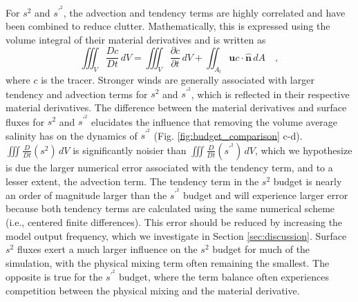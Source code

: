 For $s^2$ and $s^{\prime^2}$, the advection and tendency terms are highly correlated and have been combined to reduce clutter. Mathematically, this is expressed using the volume integral of their material derivatives and is written as 
\begin{equation}
    \iiint_V \frac{Dc}{Dt} \, dV = \iiint_V \frac{\partial c}{\partial t} \, dV + \iint_{A_l} \mathbf{u}c \cdot \hat{\mathbf{n}} \, dA \quad ,
\end{equation}
 where $c$ is the tracer. Stronger winds are generally associated with larger tendency and advection terms for $s^2$ and $s^{\prime^2}$, which is reflected in their respective material derivatives. The difference between the material derivatives and surface fluxes for $s^2$ and $s^{\prime^2}$ elucidates the influence that removing the volume average salinity has on the dynamics of $s^{\prime^2}$ (Fig. \ref{fig:budget_comparison} c-d). $\iiint \frac{D}{Dt}(s^2) \, dV$ is significantly noisier than $\iiint \frac{D}{Dt}(s^{\prime^2}) \, dV$, which we hypothesize is due the larger numerical error associated with the tendency term, and to a lesser extent, the advection term. The tendency term in the $s^2$ budget is nearly an order of magnitude larger than the $s^{\prime^2}$ budget and will experience larger error because both tendency terms are calculated using the same numerical scheme (i.e., centered finite differences). This error should be reduced by increasing the model output frequency, which we investigate in Section \ref{sec:discussion}. Surface $s^2$ fluxes exert a much larger influence on the $s^2$ budget for much of the simulation, with the physical mixing term often remaining the smallest. The opposite is true for the $s^{\prime^2}$ budget, where the term balance often experiences competition between the physical mixing and the material derivative.  

